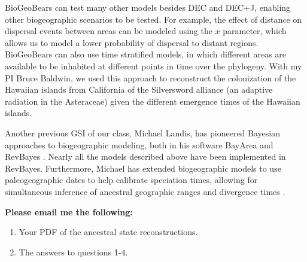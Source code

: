 \documentclass[11pt]{article}
\begin{document}
BioGeoBears can test many other models besides DEC and DEC+J,
enabling other biogeographic scenarios to be tested.
For example, the effect of distance on dispersal events between areas 
can be modeled using the $x$ parameter, 
which allows us to model a lower probability of dispersal to distant regions.
BioGeoBears can also use time stratified models, in which 
different areas are available to be inhabited at different points
in time over the phylogeny.
With my PI Bruce Baldwin, we used this approach 
to reconstruct the colonization of the Hawaiian islands
from California
of the Silversword alliance (an adaptive radiation in the Asteraceae)
given the different emergence times of the Hawaiian islands.

Another previous GSI of our class, Michael Landis,
has pioneered Bayesian approaches to biogeographic modeling,
both in his software BayArea \citep{landis2013bayesian}
and RevBayes \citep{hohna2014probabilistic}.
Nearly all the models described above have been implemented in RevBayes.
Furthermore, Michael has extended biogeographic models to use paleogeographic dates
to help calibrate speciation times, allowing for simultaneous inference
of ancestral geographic ranges and divergence times \citep{landis2015biogeographic}.

\begin{framed}
\noindent
\textbf{Please email me the following:}
\begin{enumerate}
  \item Your PDF of the ancestral state reconstructions.
  \item The answers to questions 1-4.
\end{enumerate}
\end{framed}


 
\end{document}
